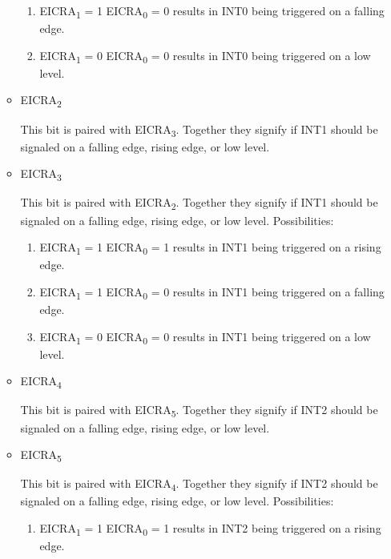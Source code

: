 \documentclass[12pt,letterpaper]{article}
\begin{document}
\begin{enumerate}
\begin{itemize}
\begin{enumerate}
					\item
					EICRA\textsubscript{1} = 1 EICRA\textsubscript{0} = 0 results in INT0 being triggered on a falling edge.
					
					\item
					EICRA\textsubscript{1} = 0 EICRA\textsubscript{0} = 0 results in INT0 being triggered on a low level.
				\end{enumerate}
			
			\item
			EICRA\textsubscript{2}
			
			This bit is paired with EICRA\textsubscript{3}.
			Together they signify if INT1 should be signaled on a falling edge, rising edge, or low level.
			
			\item 
			EICRA\textsubscript{3}
			
			This bit is paired with EICRA\textsubscript{2}.
			Together they signify if INT1 should be signaled on a falling edge, rising edge, or low level.
			Possibilities: 
			\begin{enumerate}
				\item
				EICRA\textsubscript{1} = 1 EICRA\textsubscript{0} = 1 results in INT1 being triggered on a rising edge.
				
				\item
				EICRA\textsubscript{1} = 1 EICRA\textsubscript{0} = 0 results in INT1 being triggered on a falling edge.
				
				\item
				EICRA\textsubscript{1} = 0 EICRA\textsubscript{0} = 0 results in INT1 being triggered on a low level.
			\end{enumerate}
			
			
			\item
			EICRA\textsubscript{4}
			
			This bit is paired with EICRA\textsubscript{5}.
			Together they signify if INT2 should be signaled on a falling edge, rising edge, or low level.
			
			\item 
			EICRA\textsubscript{5}
			
			This bit is paired with EICRA\textsubscript{4}.
			Together they signify if INT2 should be signaled on a falling edge, rising edge, or low level.
			Possibilities: 
			\begin{enumerate}
				\item
				EICRA\textsubscript{1} = 1 EICRA\textsubscript{0} = 1 results in INT2 being triggered on a rising edge.
				

\end{enumerate}
\end{itemize}
\end{enumerate}
\end{document}

